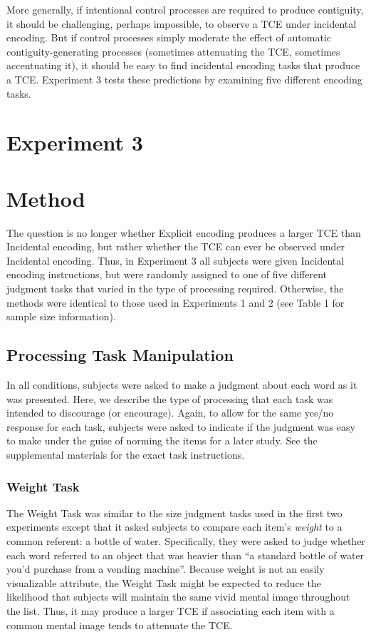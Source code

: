 \documentclass[jou,natbib,floatsintext]{apa6} %
\begin{document}
More generally, if intentional control processes are required to produce contiguity, it should be challenging, perhaps impossible, to observe a TCE under incidental encoding. But if control processes simply moderate the effect of automatic contiguity-generating processes (sometimes attenuating the TCE, sometimes accentuating it), it should be easy to find incidental encoding tasks that produce a TCE. Experiment 3 tests these predictions by examining five different encoding tasks.

\section{Experiment 3}
\section{Method}
The question is no longer whether Explicit encoding produces a larger TCE than Incidental encoding, but rather whether the TCE can ever be observed under Incidental encoding. Thus, in Experiment 3 all subjects were given Incidental encoding instructions, but were randomly assigned to one of five different judgment tasks that varied in the type of processing required. Otherwise, the methods were identical to those used in Experiments 1 and 2 (see Table 1 for sample size information).

\subsection{Processing Task Manipulation}
In all conditions, subjects were asked to make a judgment about each word as it was presented. Here, we describe the type of processing that each task was intended to discourage (or encourage). Again, to allow for the same yes/no response for each task, subjects were asked to indicate if the judgment was easy to make under the guise of norming the items for a later study. See the supplemental materials for the exact task instructions.

\subsubsection{Weight Task} The Weight Task was similar to the size judgment tasks used in the first two experiments except that it asked subjects to compare each item's \emph{weight} to a common referent: a bottle of water. Specifically, they were asked to judge whether each word referred to an object that was heavier than ``a standard bottle of water you'd purchase from a vending machine''. Because weight is not an easily visualizable attribute, the Weight Task might be expected to reduce the likelihood that subjects will maintain the same vivid mental image throughout the list. Thus, it may produce a larger TCE if associating each item with a common mental image tends to attenuate the TCE.
\end{document}
